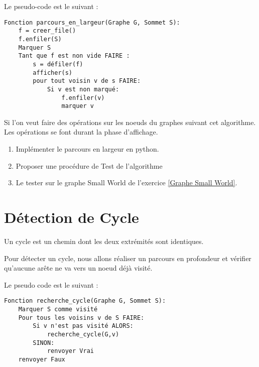 \documentclass[12pt,fleqn]{article} %
\begin{document}
Le pseudo-code est le suivant : 
\begin{center}
	\begin{varwidth}[t]{.5\textwidth}
		\begin{lstlisting}[language=Pseudo,linewidth = 12.5cm]
Fonction parcours_en_largeur(Graphe G, Sommet S):
	f = creer_file()
	f.enfiler(S)
	Marquer S
	Tant que f est non vide FAIRE : 
		s = défiler(f)
		afficher(s)
		pour tout voisin v de s FAIRE:
			Si v est non marqué:
				f.enfiler(v)
				marquer v
		\end{lstlisting}
	\end{varwidth}
\end{center}
\begin{remark}
	Si l'on veut faire des opérations sur les noeuds du graphes suivant cet algorithme. Les opérations se font durant la phase d'affichage.
\end{remark}

\begin{exercise}
	\begin{enumerate}
		\item Implémenter le parcours en largeur en python.
		\item Proposer une procédure de Test de l'algorithme
		\item Le tester sur le graphe Small World de l'exercice \ref{Graphe Small World}.
	\end{enumerate} 
\end{exercise}

\section{Détection de Cycle}
\begin{definition}
	Un cycle est un chemin dont les deux extrémités sont identiques.
\end{definition}

\begin{remark}
	Pour détecter un cycle, nous allons réaliser un parcours en profondeur et vérifier qu'aucune ar\^ete ne va vers un noeud déjà visité.
\end{remark}

Le pseudo code est le suivant : 

\begin{center}
	\begin{varwidth}[t]{.5\textwidth}
		\begin{lstlisting}[language=Pseudo,linewidth = 12.5cm]
Fonction recherche_cycle(Graphe G, Sommet S):
	Marquer S comme visité
	Pour tous les voisins v de S FAIRE:
		Si v n'est pas visité ALORS:
			recherche_cycle(G,v)
		SINON:
			renvoyer Vrai
	renvoyer Faux
		\end{lstlisting}
	\end{varwidth}
\end{center}
\end{document}
